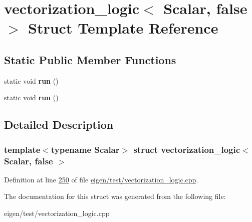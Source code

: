 \hypertarget{structvectorization__logic_3_01_scalar_00_01false_01_4}{}\section{vectorization\+\_\+logic$<$ Scalar, false $>$ Struct Template Reference}
\label{structvectorization__logic_3_01_scalar_00_01false_01_4}
\subsection*{Static Public Member Functions}
\begin{DoxyCompactItemize}
\item 
\mbox{\label{structvectorization__logic_3_01_scalar_00_01false_01_4_aba043b0fd754aa2a82cd5465281dbbb4}} 
static void {\bfseries run} ()
\item 
\mbox{\label{structvectorization__logic_3_01_scalar_00_01false_01_4_aba043b0fd754aa2a82cd5465281dbbb4}} 
static void {\bfseries run} ()
\end{DoxyCompactItemize}


\subsection{Detailed Description}
\subsubsection*{template$<$typename Scalar$>$\newline
struct vectorization\+\_\+logic$<$ Scalar, false $>$}



Definition at line \hyperlink{eigen_2test_2vectorization__logic_8cpp_source_l00250}{250} of file \hyperlink{eigen_2test_2vectorization__logic_8cpp_source}{eigen/test/vectorization\+\_\+logic.\+cpp}.



The documentation for this struct was generated from the following file\+:\begin{DoxyCompactItemize}
\item 
eigen/test/vectorization\+\_\+logic.\+cpp\end{DoxyCompactItemize}
